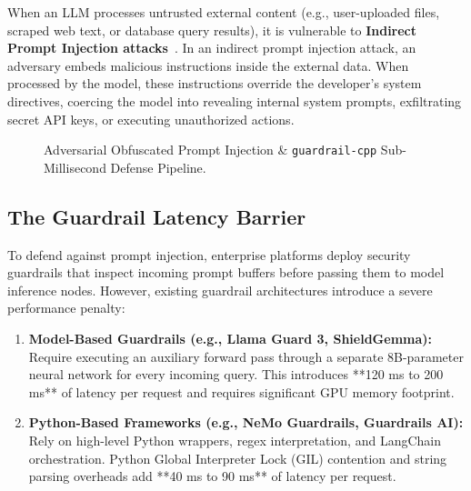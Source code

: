 \documentclass[11pt,a4paper]{article}
\begin{document}
When an LLM processes untrusted external content (e.g., user-uploaded files, scraped web text, or database query results), it is vulnerable to \textbf{Indirect Prompt Injection attacks}~\cite{prompt_injection}. In an indirect prompt injection attack, an adversary embeds malicious instructions inside the external data. When processed by the model, these instructions override the developer's system directives, coercing the model into revealing internal system prompts, exfiltrating secret API keys, or executing unauthorized actions.

\begin{figure}[h!]
\centering
{}
\caption{Adversarial Obfuscated Prompt Injection \& \texttt{guardrail-cpp} Sub-Millisecond Defense Pipeline.}
\label{fig:guardrail_pipeline}
\end{figure}

\subsection{The Guardrail Latency Barrier}
To defend against prompt injection, enterprise platforms deploy security guardrails that inspect incoming prompt buffers before passing them to model inference nodes. However, existing guardrail architectures introduce a severe performance penalty:
\begin{enumerate}
    \item \textbf{Model-Based Guardrails (e.g., Llama Guard 3, ShieldGemma):} Require executing an auxiliary forward pass through a separate 8B-parameter neural network for every incoming query. This introduces **120 ms to 200 ms** of latency per request and requires significant GPU memory footprint.
    \item \textbf{Python-Based Frameworks (e.g., NeMo Guardrails, Guardrails AI):} Rely on high-level Python wrappers, regex interpretation, and LangChain orchestration. Python Global Interpreter Lock (GIL) contention and string parsing overheads add **40 ms to 90 ms** of latency per request.
\end{enumerate}
\end{document}
